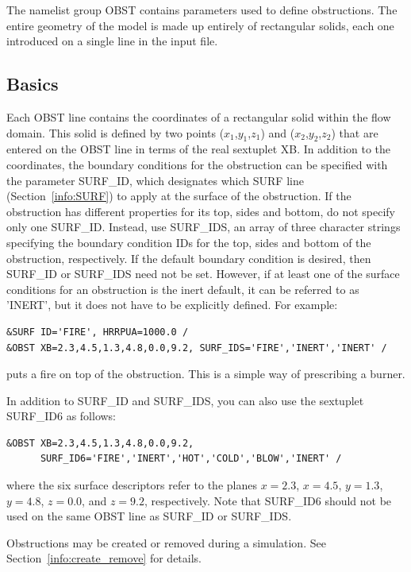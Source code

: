\documentclass[11pt]{book}
\begin{document}
The namelist group {\ct OBST} contains parameters used to define obstructions. The entire geometry of the model is made up entirely of rectangular solids, each one introduced on a single line in the input file.

\subsection{Basics}
\label{info:OBST_Basics}

Each {\ct OBST} line contains the coordinates of a rectangular
solid within the flow domain. This solid is defined by two points
($x_1$,$y_1$,$z_1$) and ($x_2$,$y_2$,$z_2$) that are entered on the
{\ct OBST} line in terms of the real sextuplet {\ct XB}.
In addition to the coordinates, the boundary conditions for the obstruction
can be specified with the parameter {\ct SURF\_ID}, which designates which
{\ct SURF} line (Section~\ref{info:SURF}) to apply at the surface of the obstruction.
If the obstruction has different properties for its top,
sides and bottom, do not specify only one {\ct SURF\_ID}. Instead, use {\ct SURF\_IDS}, an array of three character
strings specifying the boundary condition {\ct ID}s for the top,
sides and bottom of the obstruction, respectively.
If the default
boundary condition is desired, then {\ct SURF\_ID} or {\ct SURF\_IDS} need not be set.
However, if at least one of the surface conditions for an
obstruction is the inert default, it can be referred to as {\ct 'INERT'}, but it does not have to be explicitly defined.
For example:
\begin{lstlisting}
&SURF ID='FIRE', HRRPUA=1000.0 /
&OBST XB=2.3,4.5,1.3,4.8,0.0,9.2, SURF_IDS='FIRE','INERT','INERT' /
\end{lstlisting}
puts a fire on top of the obstruction. This is a simple way of
prescribing a burner.

In addition to {\ct SURF\_ID} and {\ct SURF\_IDS}, you can also use the sextuplet {\ct SURF\_ID6} as follows:
\begin{lstlisting}
&OBST XB=2.3,4.5,1.3,4.8,0.0,9.2,
      SURF_ID6='FIRE','INERT','HOT','COLD','BLOW','INERT' /
\end{lstlisting}
where the six surface descriptors refer to the planes $x=2.3$, $x=4.5$, $y=1.3$, $y=4.8$, $z=0.0$, and $z=9.2$, respectively. Note that {\ct SURF\_ID6} should not be used on the same {\ct OBST} line as {\ct SURF\_ID} or {\ct SURF\_IDS}.

Obstructions may be created or removed during a simulation. See Section~\ref{info:create_remove} for details.
\end{document}
